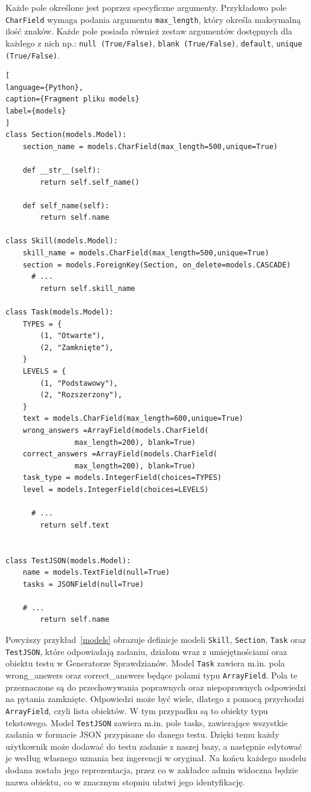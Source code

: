 \documentclass[oneside,polski,logo,indent]{amuthesis}
\begin{document}
Każde pole określone jest poprzez specyficzne argumenty. Przykładowo pole \texttt{CharField} wymaga podania argumentu \texttt{max\_length}, który określa maksymalną ilość znaków. Każde pole posiada również zestaw argumentów dostępnych dla każdego z nich np.: \texttt{null (True/False)}, \texttt{blank (True/False)}, \texttt{default}, \texttt{unique (True/False)}.

\begin{lstlisting}[
language={Python},
caption={Fragment pliku models}
label={models}
]
class Section(models.Model):
    section_name = models.CharField(max_length=500,unique=True)

    def __str__(self):
        return self.self_name()

    def self_name(self):
        return self.name

class Skill(models.Model):
    skill_name = models.CharField(max_length=500,unique=True)
    section = models.ForeignKey(Section, on_delete=models.CASCADE)
	  # ...
        return self.skill_name

class Task(models.Model):
    TYPES = {
        (1, "Otwarte"),
        (2, "Zamknięte"),
    }
    LEVELS = {
        (1, "Podstawowy"),
        (2, "Rozszerzony"),
    }
    text = models.CharField(max_length=600,unique=True)
    wrong_answers =ArrayField(models.CharField(
				max_length=200), blank=True)
    correct_answers =ArrayField(models.CharField(
				max_length=200), blank=True)
    task_type = models.IntegerField(choices=TYPES)
    level = models.IntegerField(choices=LEVELS)

	  # ...
        return self.text


class TestJSON(models.Model):
    name = models.TextField(null=True)
    tasks = JSONField(null=True)

    # ...
        return self.name
\end{lstlisting}

Powyższy przykład~\ref{models} obrazuje definicje modeli \texttt{Skill}, \texttt{Section}, \texttt{Task} oraz \texttt{TestJSON}, 
które odpowiadają zadaniu, działom wraz z umiejętnościami oraz obiektu testu w Generatorze Sprawdzianów. 
Model \texttt{Task} zawiera m.in. pola wrong\_answers oraz correct\_answers będące polami typu \texttt{ArrayField}. Pola te przeznaczone
są do przechowywania poprawnych oraz niepoprawnych odpowiedzi na pytania zamknięte. Odpowiedzi może być wiele, dlatego z pomocą
przychodzi \texttt{ArrayField}, czyli lista obiektów. W tym przypadku są to obiekty typu tekstowego.
Model \texttt{TestJSON} zawiera m.in. pole tasks, zawierające wszystkie zadania w formacie JSON przypisane do danego testu.
Dzięki temu każdy użytkownik może dodawać do testu zadanie z naszej bazy, a następnie edytować je według własnego uznania bez ingerencji
w oryginał.
Na końcu każdego modelu dodana została jego reprezentacja, przez co w zakładce admin widoczna będzie nazwa obiektu, co w znacznym stopniu ułatwi jego identyfikację.
\end{document}
